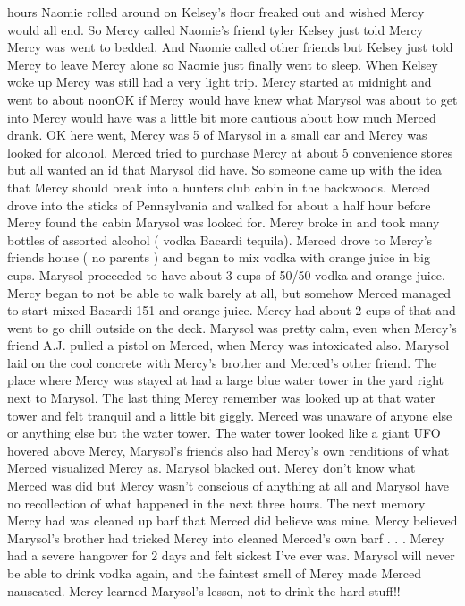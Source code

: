 \documentclass[12pt]{book}
\begin{document}
hours Naomie rolled around on Kelsey's floor freaked out and wished Mercy would all end. So Mercy called Naomie's friend tyler Kelsey just told Mercy Mercy was went to bedded. And Naomie called other friends but Kelsey just told Mercy to leave Mercy alone so Naomie just finally went to sleep. When Kelsey woke up Mercy was still had a very light trip. Mercy started at midnight and went to about noonOK if Mercy would have knew what Marysol was about to get into Mercy would have was a little bit more cautious about how much Merced drank. OK here went, Mercy was 5 of Marysol in a small car and Mercy was looked for alcohol. Merced tried to purchase Mercy at about 5 convenience stores but all wanted an id that Marysol did have. So someone came up with the idea that Mercy should break into a hunters club cabin in the backwoods. Merced drove into the sticks of Pennsylvania and walked for about a half hour before Mercy found the cabin Marysol was looked for. Mercy broke in and took many bottles of assorted alcohol ( vodka Bacardi tequila). Merced drove to Mercy's friends house ( no parents ) and began to mix vodka with orange juice in big cups. Marysol proceeded to have about 3 cups of 50/50 vodka and orange juice. Mercy began to not be able to walk barely at all, but somehow Merced managed to start mixed Bacardi 151 and orange juice. Mercy had about 2 cups of that and went to go chill outside on the deck. Marysol was pretty calm, even when Mercy's friend A.J. pulled a pistol on Merced, when Mercy was intoxicated also. Marysol laid on the cool concrete with Mercy's brother and Merced's other friend. The place where Mercy was stayed at had a large blue water tower in the yard right next to Marysol. The last thing Mercy remember was looked up at that water tower and felt tranquil and a little bit giggly. Merced was unaware of anyone else or anything else but the water tower. The water tower looked like a giant UFO hovered above Mercy, Marysol's friends also had Mercy's own renditions of what Merced visualized Mercy as. Marysol blacked out. Mercy don't know what Merced was did but Mercy wasn't conscious of anything at all and Marysol have no recollection of what happened in the next three hours. The next memory Mercy had was cleaned up barf that Merced did believe was mine. Mercy believed Marysol's brother had tricked Mercy into cleaned Merced's own barf . . .  Mercy had a severe hangover for 2 days and felt sickest I've ever was. Marysol will never be able to drink vodka again, and the faintest smell of Mercy made Merced nauseated. Mercy learned Marysol's lesson, not to drink the hard stuff!!
\end{document}
